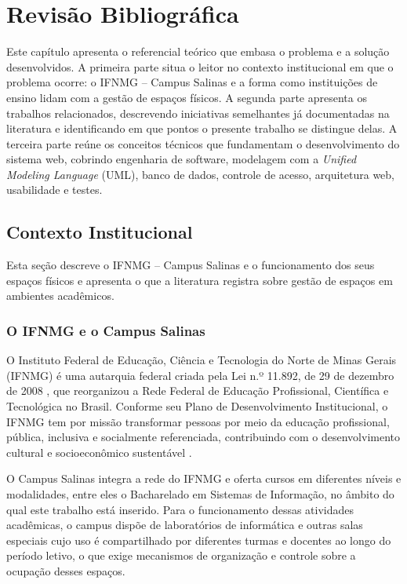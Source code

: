 \chapter{Revisão Bibliográfica}
\label{sec:revbib}

Este capítulo apresenta o referencial teórico que embasa o problema e a solução desenvolvidos. A primeira parte situa o leitor no contexto institucional em que o problema ocorre: o IFNMG -- Campus Salinas e a forma como instituições de ensino lidam com a gestão de espaços físicos. A segunda parte apresenta os trabalhos relacionados, descrevendo iniciativas semelhantes já documentadas na literatura e identificando em que pontos o presente trabalho se distingue delas. A terceira parte reúne os conceitos técnicos que fundamentam o desenvolvimento do sistema web, cobrindo engenharia de software, modelagem com a \textit{Unified Modeling Language} (UML), banco de dados, controle de acesso, arquitetura web, usabilidade e testes.

\section{Contexto Institucional}
\label{sec:contexto}

Esta seção descreve o IFNMG -- Campus Salinas e o funcionamento dos seus espaços físicos e apresenta o que a literatura registra sobre gestão de espaços em ambientes acadêmicos.

\subsection{O IFNMG e o Campus Salinas}
\label{sec:ifnmg}

O Instituto Federal de Educação, Ciência e Tecnologia do Norte de Minas Gerais (IFNMG) é uma autarquia federal criada pela Lei n.º 11.892, de 29 de dezembro de 2008 \cite{brasil2008lei}, que reorganizou a Rede Federal de Educação Profissional, Científica e Tecnológica no Brasil. Conforme seu Plano de Desenvolvimento Institucional, o IFNMG tem por missão transformar pessoas por meio da educação profissional, pública, inclusiva e socialmente referenciada, contribuindo com o desenvolvimento cultural e socioeconômico sustentável \cite[p.~23]{ifnmg2024pdi}.

O Campus Salinas integra a rede do IFNMG e oferta cursos em diferentes níveis e modalidades, entre eles o Bacharelado em Sistemas de Informação, no âmbito do qual este trabalho está inserido. Para o funcionamento dessas atividades acadêmicas, o campus dispõe de laboratórios de informática e outras salas especiais cujo uso é compartilhado por diferentes turmas e docentes ao longo do período letivo, o que exige mecanismos de organização e controle sobre a ocupação desses espaços.

